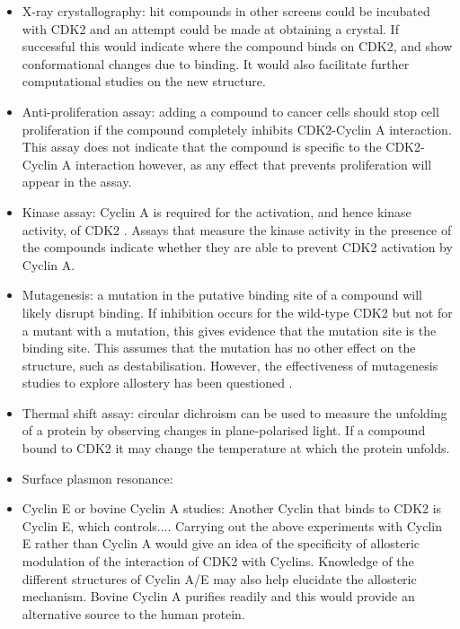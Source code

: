 \begin{itemize}
\item X-ray crystallography: hit compounds in other screens could be incubated with CDK2 and an attempt could be made at obtaining a crystal.
If successful this would indicate where the compound binds on CDK2, and show conformational changes due to binding.
It would also facilitate further computational studies on the new structure.
\item Anti-proliferation assay: adding a compound to cancer cells should stop cell proliferation if the compound completely inhibits CDK2-Cyclin A interaction.
This assay does not indicate that the compound is specific to the CDK2-Cyclin A interaction however, as any effect that prevents proliferation will appear in the assay.
\item Kinase assay: Cyclin A is required for the activation, and hence kinase activity, of CDK2 \cite{Jeffrey1995}.
Assays that measure the kinase activity in the presence of the compounds indicate whether they are able to prevent CDK2 activation by Cyclin A.
\item Mutagenesis: a mutation in the putative binding site of a compound will likely disrupt binding.
If inhibition occurs for the wild-type CDK2 but not for a mutant with a mutation, this gives evidence that the mutation site is the binding site.
This assumes that the mutation has no other effect on the structure, such as destabilisation.
However, the effectiveness of mutagenesis studies to explore allostery has been questioned \cite{Tang2017}.
\item Thermal shift assay: circular dichroism can be used to measure the unfolding of a protein by observing changes in plane-polarised light. %
If a compound bound to CDK2 it may change the temperature at which the protein unfolds.
\item Surface plasmon resonance:
\item Cyclin E or bovine Cyclin A studies: Another Cyclin that binds to CDK2 is Cyclin E, which controls...\cite{}. %
Carrying out the above experiments with Cyclin E rather than Cyclin A would give an idea of the specificity of allosteric modulation of the interaction of CDK2 with Cyclins.
Knowledge of the different structures of Cyclin A/E may also help elucidate the allosteric mechanism.
Bovine Cyclin A purifies readily \cite{} and this would provide an alternative source to the human protein.

\end{itemize}
